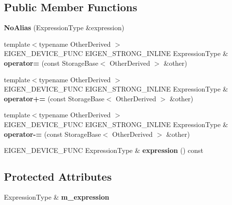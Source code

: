 \subsection*{Public Member Functions}
\begin{DoxyCompactItemize}
\item 
\mbox{\label{class_eigen_1_1_no_alias_a5f394631fdd75723476bc8aa39f9c65f}} 
{\bfseries No\+Alias} (Expression\+Type \&expression)
\item 
\mbox{\label{class_eigen_1_1_no_alias_a226e32f7cda9c7bb708256b4e66ae609}} 
{\footnotesize template$<$typename Other\+Derived $>$ }\\E\+I\+G\+E\+N\+\_\+\+D\+E\+V\+I\+C\+E\+\_\+\+F\+U\+NC E\+I\+G\+E\+N\+\_\+\+S\+T\+R\+O\+N\+G\+\_\+\+I\+N\+L\+I\+NE Expression\+Type \& {\bfseries operator=} (const Storage\+Base$<$ Other\+Derived $>$ \&other)
\item 
\mbox{\label{class_eigen_1_1_no_alias_a2436b0de67b4aeecb4376977161cc238}} 
{\footnotesize template$<$typename Other\+Derived $>$ }\\E\+I\+G\+E\+N\+\_\+\+D\+E\+V\+I\+C\+E\+\_\+\+F\+U\+NC E\+I\+G\+E\+N\+\_\+\+S\+T\+R\+O\+N\+G\+\_\+\+I\+N\+L\+I\+NE Expression\+Type \& {\bfseries operator+=} (const Storage\+Base$<$ Other\+Derived $>$ \&other)
\item 
\mbox{\label{class_eigen_1_1_no_alias_a3b2c32fd05aea8b1e1b61754711ed0e8}} 
{\footnotesize template$<$typename Other\+Derived $>$ }\\E\+I\+G\+E\+N\+\_\+\+D\+E\+V\+I\+C\+E\+\_\+\+F\+U\+NC E\+I\+G\+E\+N\+\_\+\+S\+T\+R\+O\+N\+G\+\_\+\+I\+N\+L\+I\+NE Expression\+Type \& {\bfseries operator-\/=} (const Storage\+Base$<$ Other\+Derived $>$ \&other)
\item 
\mbox{\label{class_eigen_1_1_no_alias_a7b487c830713e3e38c839cdb3e2be6f9}} 
E\+I\+G\+E\+N\+\_\+\+D\+E\+V\+I\+C\+E\+\_\+\+F\+U\+NC Expression\+Type \& {\bfseries expression} () const
\end{DoxyCompactItemize}
\subsection*{Protected Attributes}
\begin{DoxyCompactItemize}
\item 
\mbox{\label{class_eigen_1_1_no_alias_ab61d2c9d39ef278fcc8182b7322752ca}} 
Expression\+Type \& {\bfseries m\+\_\+expression}
\end{DoxyCompactItemize}


